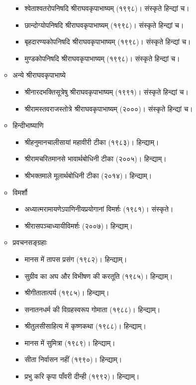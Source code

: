 \begin{itemize}
\begin{itemize}
\begin{itemize}
		\item श्वेताश्वतरोपनिषदि श्रीराघवकृपाभाष्यम् (१९९८)। संस्कृते हिन्द्यां च।
		\item छान्दोग्योपनिषदि श्रीराघवकृपाभाष्यम् (१९९८)। संस्कृते हिन्द्यां च।
		\item बृहदारण्यकोपनिषदि श्रीराघवकृपाभाष्यम् (१९९८)। संस्कृते हिन्द्यां च।
		\item मुण्डकोपनिषदि श्रीराघवकृपाभाष्यम् (१९९८)। संस्कृते हिन्द्यां च।
		\end{itemize}
	\item अन्ये श्रीराघवकृपाभाष्ये
		\begin{itemize}
		\item श्रीनारदभक्तिसूत्रेषु श्रीराघवकृपाभाष्यम् (१९९१)। संस्कृते हिन्द्यां च।
		\item श्रीरामस्तवराजस्तोत्रे श्रीराघवकृपाभाष्यम् (२०००)। संस्कृते हिन्द्यां च।
		\end{itemize}
	\item हिन्दीभाष्याणि
		\begin{itemize}
		\item श्रीहनुमानचालीसायां महावीरी टीका (१९८३)। हिन्द्याम्।
		\item श्रीरामचरितमानसे भावार्थबोधिनी टीका (२००५)। हिन्द्याम्।
		\item श्रीभक्तमाले मूलार्थबोधिनी टीका (२०१४)। हिन्द्याम्।
		\end{itemize}
	\item विमर्शौ
		\begin{itemize}
		\item अध्यात्मरामायणेऽपाणिनीयप्रयोगानां विमर्शः (१९८१)। संस्कृते।
		\item श्रीरासपञ्चाध्यायीविमर्शः (२००७)। हिन्द्याम्।
		\end{itemize}
	\item प्रवचनसङ्ग्रहाः
		\begin{itemize}
		\item मानस में तापस प्रसंग (१९८२)। हिन्द्याम्।
		\item सुग्रीव का अघ और विभीषण की करतूति (१९८५)। हिन्द्याम्।
		\item श्रीगीतातात्पर्य (१९८५)। हिन्द्याम्।
		\item सनातनधर्म की विग्रहस्वरूप गोमाता (१९८८)। हिन्द्याम्।
		\item श्रीतुलसीसाहित्य में कृष्णकथा (१९८८)। हिन्द्याम्।
		\item मानस में सुमित्रा (१९८९)। हिन्द्याम्।
		\item सीता निर्वासन नहीं (१९९०)। हिन्द्याम्।
		\item प्रभु करि कृपा पाँवरी दीन्ही (१९९२)। हिन्द्याम्।

\end{itemize}
\end{itemize}
\end{itemize}
